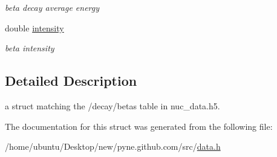 \begin{DoxyCompactItemize}
\begin{DoxyCompactList}\small\item\em beta decay average energy \end{DoxyCompactList}\item 
double \hyperlink{structpyne_1_1beta_a9c2cd5b0d491324940bdd68bde23113a}{intensity}\hypertarget{structpyne_1_1beta_a9c2cd5b0d491324940bdd68bde23113a}{}\label{structpyne_1_1beta_a9c2cd5b0d491324940bdd68bde23113a}

\begin{DoxyCompactList}\small\item\em beta intensity \end{DoxyCompactList}\end{DoxyCompactItemize}


\subsection{Detailed Description}
a struct matching the \textquotesingle{}/decay/betas\textquotesingle{} table in nuc\+\_\+data.\+h5. 

The documentation for this struct was generated from the following file\+:\begin{DoxyCompactItemize}
\item 
/home/ubuntu/\+Desktop/new/pyne.\+github.\+com/src/\hyperlink{data_8h}{data.\+h}\end{DoxyCompactItemize}
